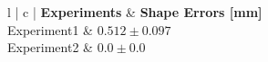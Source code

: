 \begin{table}[!]
\setlength{\tabcolsep}{3pt}
\centering
\caption{Overall Needle Reconstruction Errors ($\mu \pm \sigma$)}
\begin{tabular}{ l | c |}
\hline
{} {\textbf{Experiments}} & \textbf{Shape Errors [mm]} \\
\hline
{} {Experiment1}				& $0.512 \pm 0.097$ \\
 {Experiment2}  				& $0.0 \pm 0.0$ \\
\hline
\end{tabular}
\label{tab:ErrorsNeedleReconstruction}
\end{table} 
